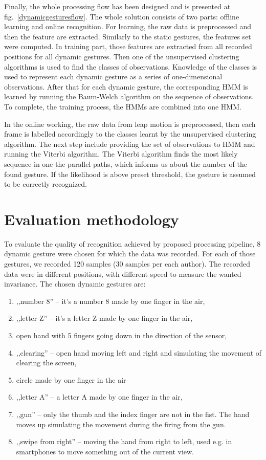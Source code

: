 Finally, the whole processing flow has been designed and is presented at fig.~\ref{dynamicgesturesflow}.
The whole solution consists of two parts: offline learning and online recognition.
For learning, the raw data is preprocessed and then the feature are extracted. 
Similarly to the static gestures, the features set were computed. 
In training part, those features are extracted from all recorded positions for all dynamic gestures.
Then one of the unsupervised clustering algorithms is used to find the classes of observations.
Knowledge of the classes is used to represent each dynamic gesture as a series of one-dimensional observations.
After that for each dynamic gesture, the corresponding HMM is learned by running the Baum-Welch algorithm on the sequence of observations.
To complete, the training process, the HMMs are combined into one HMM.

In the online working, the raw data from leap motion is preprocessed, then each frame is labelled accordingly to the classes learnt by the unsupervised clustering algorithm.
The next step include providing the set of observations to HMM and running the Viterbi algorithm.
The Viterbi algorithm finds the most likely sequence in one the parallel paths, which informs us about the number of the found gesture. 
If the likelihood is above preset threshold, the gesture is assumed to be correctly recognized.


\section{Evaluation methodology}

To evaluate the quality of recognition achieved by proposed processing pipeline, 8 dynamic gesture were chosen for which the data was recorded.
For each of those gestures, we recorded 120 samples (30 samples per each author).
The recorded data were in different positions, with different speed to measure the wanted invariance.
The chosen dynamic gestures are:
\begin{enumerate}
\item ,,number 8'' -- it's a number 8 made by one finger in the air,
\item ,,letter Z'' -- it's a letter Z made by one finger in the air,
\item open hand with 5 fingers going down in the direction of the sensor,
\item ,,clearing'' -- open hand moving left and right and simulating the movement of clearing the screen,
\item circle made by one finger in the air
\item ,,letter A'' -- a letter A made by one finger in the air,
\item ,,gun'' -- only the thumb and the index finger are not in the fist. The hand moves up simulating the movement during the firing from the gun.
\item ,,swipe from right'' -- moving the hand from right to left, used e.g. in smartphones to move something out of the current view.
\end{enumerate}


